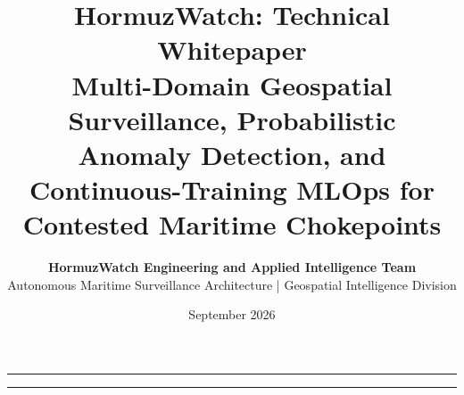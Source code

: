\documentclass[11pt,a4paper]{article}
\title{\vspace{-1.5cm}\textbf{\huge\color{indigoprimary}HormuzWatch: Technical Whitepaper}\\[0.4cm]
\Large\textbf{Multi-Domain Geospatial Surveillance, Probabilistic Anomaly Detection, and Continuous-Training MLOps for Contested Maritime Chokepoints}}
\author{\textbf{HormuzWatch Engineering and Applied Intelligence Team}\\[0.1cm]
\small Autonomous Maritime Surveillance Architecture | Geospatial Intelligence Division}
\date{September 2026}
\begin{document}
\maketitle
\thispagestyle{empty}

\vspace{-0.5cm}
\noindent\textcolor{textsecondary}{\rule{\textwidth}{0.8pt}}



\noindent\textcolor{textsecondary}{\rule{\textwidth}{0.8pt}}
\vspace{0.4cm}

\tableofcontents
\vspace{0.5cm}
\listoffigures
\listoftables
\newpage



















\newpage

\end{document}
